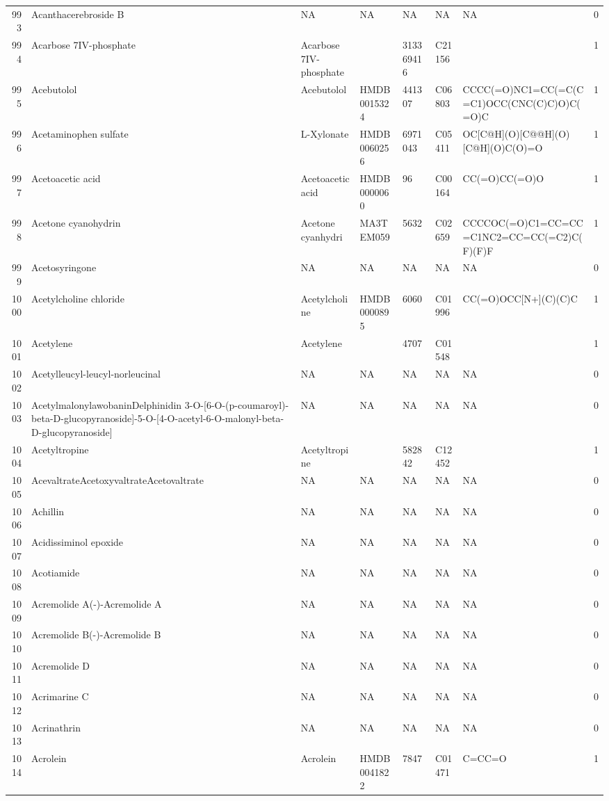 \documentclass[a4paper]{article}
\begin{document}
\begin{longtable}{rlllllll}
  993 & Acanthacerebroside B & NA & NA & NA & NA & NA & 0 \\ 
  994 & Acarbose 7IV-phosphate & Acarbose 7IV-phosphate &  & 313369416 & C21156 &  & 1 \\ 
  995 & Acebutolol & Acebutolol & HMDB0015324 & 441307 & C06803 & CCCC(=O)NC1=CC(=C(C=C1)OCC(CNC(C)C)O)C(=O)C & 1 \\ 
  996 & Acetaminophen sulfate & L-Xylonate & HMDB0060256 & 6971043 & C05411 & OC[C@H](O)[C@@H](O)[C@H](O)C(O)=O & 1 \\ 
  997 & Acetoacetic acid & Acetoacetic acid & HMDB0000060 & 96 & C00164 & CC(=O)CC(=O)O & 1 \\ 
  998 & Acetone cyanohydrin & Acetone cyanhydri & MA3TEM059 & 5632 & C02659 & CCCCOC(=O)C1=CC=CC=C1NC2=CC=CC(=C2)C(F)(F)F & 1 \\ 
  999 & Acetosyringone & NA & NA & NA & NA & NA & 0 \\ 
  1000 & Acetylcholine chloride & Acetylcholine & HMDB0000895 & 6060 & C01996 & CC(=O)OCC[N+](C)(C)C & 1 \\ 
  1001 & Acetylene & Acetylene &  & 4707 & C01548 &  & 1 \\ 
  1002 & Acetylleucyl-leucyl-norleucinal & NA & NA & NA & NA & NA & 0 \\ 
  1003 & AcetylmalonylawobaninDelphinidin 3-O-[6-O-(p-coumaroyl)-beta-D-glucopyranoside]-5-O-[4-O-acetyl-6-O-malonyl-beta-D-glucopyranoside] & NA & NA & NA & NA & NA & 0 \\ 
  1004 & Acetyltropine & Acetyltropine &  & 582842 & C12452 &  & 1 \\ 
  1005 & AcevaltrateAcetoxyvaltrateAcetovaltrate & NA & NA & NA & NA & NA & 0 \\ 
  1006 & Achillin & NA & NA & NA & NA & NA & 0 \\ 
  1007 & Acidissiminol epoxide & NA & NA & NA & NA & NA & 0 \\ 
  1008 & Acotiamide & NA & NA & NA & NA & NA & 0 \\ 
  1009 & Acremolide A(-)-Acremolide A & NA & NA & NA & NA & NA & 0 \\ 
  1010 & Acremolide B(-)-Acremolide B & NA & NA & NA & NA & NA & 0 \\ 
  1011 & Acremolide D & NA & NA & NA & NA & NA & 0 \\ 
  1012 & Acrimarine C & NA & NA & NA & NA & NA & 0 \\ 
  1013 & Acrinathrin & NA & NA & NA & NA & NA & 0 \\ 
  1014 & Acrolein & Acrolein & HMDB0041822 & 7847 & C01471 & C=CC=O & 1 \\ 

\end{longtable}
\end{document}
